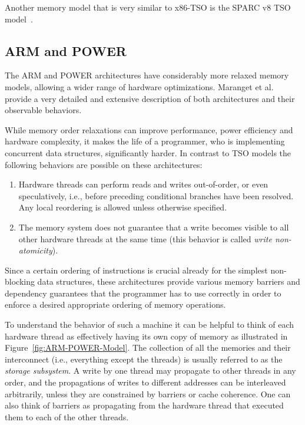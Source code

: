 \documentclass[a4paper,12pt,notitlepage,twoside,openright]{article}
\begin{document}
Another memory model that is very similar to x86-TSO is the SPARC v8
TSO model~\cite{SPARCv8}.

\subsection{ARM and POWER}
\label{ARM-POWER}
The ARM and POWER architectures have considerably more relaxed memory
models, allowing a wider range of hardware optimizations. Maranget et
al.~\cite{Maranget:2012} provide a very detailed and extensive
description of both architectures and their observable behaviors.

While memory order relaxations can improve performance, power
efficiency and hardware complexity, it makes the life of a programmer,
who is implementing concurrent data structures, significantly
harder. In contrast to TSO models the following behaviors are possible
on these architectures:
\begin{enumerate}
	\item Hardware threads can perform reads and writes
          out-of-order, or even speculatively, i.e., before preceding
          conditional branches have been resolved. Any local
          reordering is allowed unless otherwise specified.
	\item The memory system does not guarantee that a write
          becomes visible to all other hardware threads at the same
          time (this behavior is called \emph{write non-atomicity}).
\end{enumerate}

Since a certain ordering of instructions is crucial already for the
simplest non-blocking data structures, these architectures provide
various memory barriers and dependency guarantees that the programmer
has to use correctly in order to enforce a desired appropriate ordering of
memory operations.

To understand the behavior of such a machine it can be helpful to
think of each hardware thread as effectively having its own copy of
memory as illustrated in Figure~\ref{fig:ARM-POWER-Model}. The
collection of all the memories and their interconnect (i.e.,
everything except the threads) is usually referred to as the
\emph{storage subsystem}. A write by one thread may propagate to other
threads in any order, and the propagations of writes to different
addresses can be interleaved arbitrarily, unless they are constrained
by barriers or cache coherence. One can also think of barriers as
propagating from the hardware thread that executed them to each of the
other threads.
\end{document}
